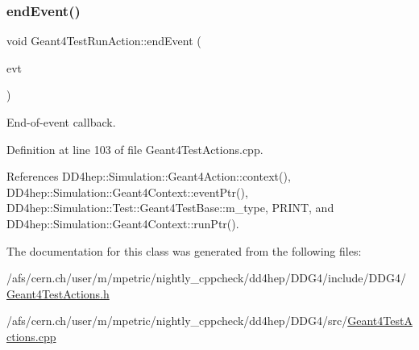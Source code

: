 \subsubsection{\texorpdfstring{end\+Event()}{endEvent()}}
{\footnotesize\ttfamily void Geant4\+Test\+Run\+Action\+::end\+Event (\begin{DoxyParamCaption}\item[{const G4\+Event $\ast$}]{evt }\end{DoxyParamCaption})}



End-\/of-\/event callback. 



Definition at line 103 of file Geant4\+Test\+Actions.\+cpp.



References D\+D4hep\+::\+Simulation\+::\+Geant4\+Action\+::context(), D\+D4hep\+::\+Simulation\+::\+Geant4\+Context\+::event\+Ptr(), D\+D4hep\+::\+Simulation\+::\+Test\+::\+Geant4\+Test\+Base\+::m\+\_\+type, P\+R\+I\+NT, and D\+D4hep\+::\+Simulation\+::\+Geant4\+Context\+::run\+Ptr().



The documentation for this class was generated from the following files\+:\begin{DoxyCompactItemize}
\item 
/afs/cern.\+ch/user/m/mpetric/nightly\+\_\+cppcheck/dd4hep/\+D\+D\+G4/include/\+D\+D\+G4/\hyperlink{_geant4_test_actions_8h}{Geant4\+Test\+Actions.\+h}\item 
/afs/cern.\+ch/user/m/mpetric/nightly\+\_\+cppcheck/dd4hep/\+D\+D\+G4/src/\hyperlink{_geant4_test_actions_8cpp}{Geant4\+Test\+Actions.\+cpp}\end{DoxyCompactItemize}
